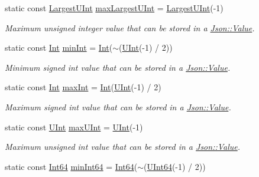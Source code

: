 \begin{DoxyCompactItemize}
static const \hyperlink{class_json_1_1_value_a6682a3684d635e03fc06ba229fa24eec}{Largest\+U\+Int} \hyperlink{class_json_1_1_value_a8ddb32d9d55fa5323ae5135639dc2e31}{max\+Largest\+U\+Int} = \hyperlink{class_json_1_1_value_a6682a3684d635e03fc06ba229fa24eec}{Largest\+U\+Int}(-\/1)
\begin{DoxyCompactList}\small\item\em Maximum unsigned integer value that can be stored in a \hyperlink{class_json_1_1_value}{Json\+::\+Value}. \end{DoxyCompactList}\item 
static const \hyperlink{class_json_1_1_value_abdf7a7ff73eb130ffcab28504ffdb405}{Int} \hyperlink{class_json_1_1_value_a7df8a39e2502b8c92a6a41e3d752d2c8}{min\+Int} = \hyperlink{class_json_1_1_value_abdf7a7ff73eb130ffcab28504ffdb405}{Int}($\sim$(\hyperlink{class_json_1_1_value_a0933d59b45793ae4aade1757c322a98d}{U\+Int}(-\/1) / 2))
\begin{DoxyCompactList}\small\item\em Minimum signed int value that can be stored in a \hyperlink{class_json_1_1_value}{Json\+::\+Value}. \end{DoxyCompactList}\item 
static const \hyperlink{class_json_1_1_value_abdf7a7ff73eb130ffcab28504ffdb405}{Int} \hyperlink{class_json_1_1_value_a978c799a8af3114ef7dab6fd0a310a1b}{max\+Int} = \hyperlink{class_json_1_1_value_abdf7a7ff73eb130ffcab28504ffdb405}{Int}(\hyperlink{class_json_1_1_value_a0933d59b45793ae4aade1757c322a98d}{U\+Int}(-\/1) / 2)
\begin{DoxyCompactList}\small\item\em Maximum signed int value that can be stored in a \hyperlink{class_json_1_1_value}{Json\+::\+Value}. \end{DoxyCompactList}\item 
static const \hyperlink{class_json_1_1_value_a0933d59b45793ae4aade1757c322a98d}{U\+Int} \hyperlink{class_json_1_1_value_ac79e63ee68d3aa914bfd6988be669b87}{max\+U\+Int} = \hyperlink{class_json_1_1_value_a0933d59b45793ae4aade1757c322a98d}{U\+Int}(-\/1)
\begin{DoxyCompactList}\small\item\em Maximum unsigned int value that can be stored in a \hyperlink{class_json_1_1_value}{Json\+::\+Value}. \end{DoxyCompactList}\item 
static const \hyperlink{class_json_1_1_value_a1b86af9f85f0f1baa972c3319fa22695}{Int64} \hyperlink{class_json_1_1_value_a815ef899bc312c93bc426511acfe31a7}{min\+Int64} = \hyperlink{class_json_1_1_value_a1b86af9f85f0f1baa972c3319fa22695}{Int64}($\sim$(\hyperlink{class_json_1_1_value_a8b62564be8c087c6d18de180ff4e13e3}{U\+Int64}(-\/1) / 2))

\end{DoxyCompactItemize}
